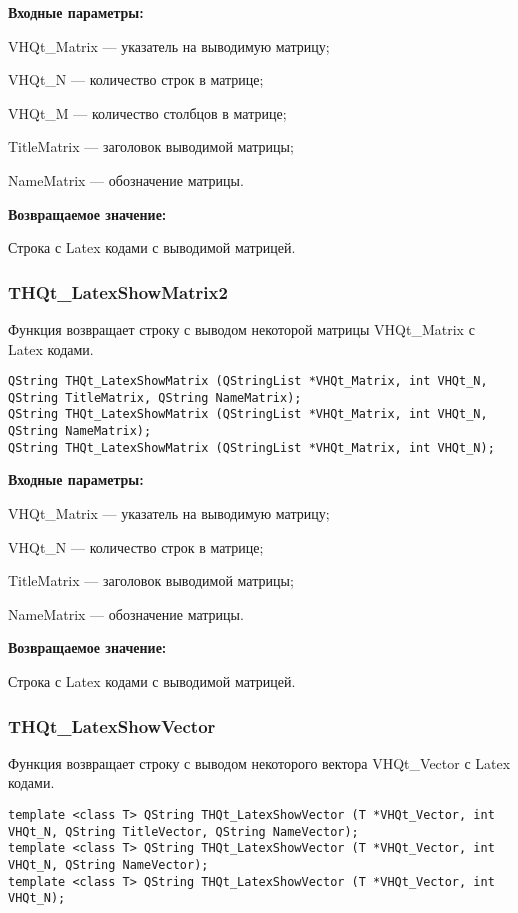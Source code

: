 \documentclass[a4paper,12pt]{article}
\begin{document}
\textbf{Входные параметры:}

VHQt\_Matrix --- указатель на выводимую матрицу;
 
VHQt\_N --- количество строк в матрице;
 
VHQt\_M --- количество столбцов в матрице;
 
TitleMatrix --- заголовок выводимой матрицы;
 
NameMatrix --- обозначение матрицы.
	
\textbf{Возвращаемое значение:}

Строка с Latex кодами с выводимой матрицей.


\subsubsection{THQt\_LatexShowMatrix2}\label{THQt_LatexShowMatrix2}

Функция возвращает строку с выводом некоторой матрицы VHQt\_Matrix с Latex кодами.


\begin{lstlisting}[label=code_syntax_THQt_LatexShowMatrix2,caption=Синтаксис]
QString THQt_LatexShowMatrix (QStringList *VHQt_Matrix, int VHQt_N, QString TitleMatrix, QString NameMatrix);
QString THQt_LatexShowMatrix (QStringList *VHQt_Matrix, int VHQt_N, QString NameMatrix);
QString THQt_LatexShowMatrix (QStringList *VHQt_Matrix, int VHQt_N);
\end{lstlisting}

\textbf{Входные параметры:}

VHQt\_Matrix --- указатель на выводимую матрицу;
 
VHQt\_N --- количество строк в матрице;
 
TitleMatrix --- заголовок выводимой матрицы;
 
NameMatrix --- обозначение матрицы.
	
\textbf{Возвращаемое значение:}

Строка с Latex кодами с выводимой матрицей.


\subsubsection{THQt\_LatexShowVector}\label{THQt_LatexShowVector}

Функция возвращает строку с выводом некоторого вектора VHQt\_Vector с Latex кодами.


\begin{lstlisting}[label=code_syntax_THQt_LatexShowVector,caption=Синтаксис]
template <class T> QString THQt_LatexShowVector (T *VHQt_Vector, int VHQt_N, QString TitleVector, QString NameVector);
template <class T> QString THQt_LatexShowVector (T *VHQt_Vector, int VHQt_N, QString NameVector);
template <class T> QString THQt_LatexShowVector (T *VHQt_Vector, int VHQt_N);
\end{lstlisting}
\end{document}
